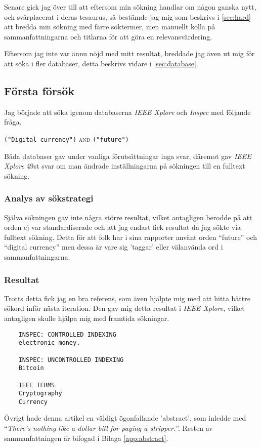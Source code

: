 \documentclass[a4paper,11pt,exjobb]{kth-mag}
\begin{document}
Senare gick jag över till att eftersom min sökning handlar om någon ganska nytt, och svårplacerat i deras tesaurus, så bestämde jag mig som beskrivs i \ref{sec:hard} att bredda min sökning med färre söktermer, men manuellt kolla på sammanfattningarna och titlarna för att göra en relevansvärdering.

Eftersom jag inte var ännu nöjd med mitt resultat, breddade jag även ut mig för att söka i fler databaser, detta beskrivs vidare i \ref{sec:database}.
\newpage
\subsection{Första försök}
\label{sec:first}
Jag började att söka igenom databaserna \textit{IEEE Xplore} och \textit{Inspec} med följande fråga.
\begin{center}
\verb#("Digital currency")# \textsc{and} \verb#("future")#
\end{center}
Båda databaser gav under vanliga förutsättningar inga svar, däremot gav \textit{IEEE Xplore} 49st svar om man ändrade inställningarna på sökningen till en fulltext sökning.

\subsubsection{Analys av sökstrategi}
Själva sökningen gav inte några större resultat, vilket antagligen berodde på att orden ej var standardiserade och att jag endast fick resultat då jag sökte via fulltext sökning. Detta för att folk har i sina rapporter använt orden ``future'' och ``digital currency'' men dessa är vare sig 'taggar' eller välanvända ord i sammanfattningarna.

\subsubsection{Resultat}
Trotts detta fick jag en bra referens\cite{first}, som även hjälpte mig med att hitta bättre sökord inför nästa iteration. 
Den gav mig detta resultat i \textit{IEEE Xplore}, vilket antagligen skulle hjälpa mig med framtida sökningar. 
\begin{verbatim}
    INSPEC: CONTROLLED INDEXING
    electronic money.

    INSPEC: UNCONTROLLED INDEXING
    Bitcoin

    IEEE TERMS
    Cryptography
    Currency
\end{verbatim}


Övrigt hade  denna artikel en väldigt ögonfallande 'abstract', som inledde med ``\textit{There's nothing like a dollar bill for paying a stripper.}''. Resten av sammanfattningen är bifogad i Bilaga \ref{app:abstract}.
\end{document}
